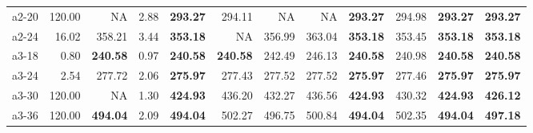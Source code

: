 \documentclass[aspectratio=1610]{beamer}
\begin{document}
\begin{frame}
\begin{table}[]
{\begin{tabular}{lrrrrrrrrrrr}
a2-20                                          & 120.00       & \multicolumn{1}{r|}{NA}                                     & 2.88              & \textbf{293.27} & \multicolumn{1}{r|}{294.11}                                 & NA              & \multicolumn{1}{r|}{NA}       & \textbf{293.27} & \multicolumn{1}{r|}{294.98}                                 & \textbf{293.27} & {\color[HTML]{FE0000} \textbf{293.27}} \\
a2-24                                          & 16.02        & \multicolumn{1}{r|}{358.21}                                 & 3.44              & \textbf{353.18} & \multicolumn{1}{r|}{NA}                                     & 356.99          & \multicolumn{1}{r|}{363.04}   & \textbf{353.18} & \multicolumn{1}{r|}{353.45}                                 & \textbf{353.18} & {\color[HTML]{FE0000} \textbf{353.18}} \\
a3-18                                          & 0.80         & \multicolumn{1}{r|}{\textbf{240.58}}                        & 0.97              & \textbf{240.58} & \multicolumn{1}{r|}{{\color[HTML]{FE0000} \textbf{240.58}}} & 242.49          & \multicolumn{1}{r|}{246.13}   & \textbf{240.58} & \multicolumn{1}{r|}{240.98}                                 & \textbf{240.58} & {\color[HTML]{FE0000} \textbf{240.58}} \\
a3-24                                          & 2.54         & \multicolumn{1}{r|}{277.72}                                 & 2.06              & \textbf{275.97} & \multicolumn{1}{r|}{277.43}                                 & 277.52          & \multicolumn{1}{r|}{277.52}   & \textbf{275.97} & \multicolumn{1}{r|}{277.46}                                 & \textbf{275.97} & {\color[HTML]{FE0000} \textbf{275.97}} \\
a3-30                                          & 120.00       & \multicolumn{1}{r|}{NA}                                     & 1.30              & \textbf{424.93} & \multicolumn{1}{r|}{436.20}                                 & 432.27          & \multicolumn{1}{r|}{436.56}   & \textbf{424.93} & \multicolumn{1}{r|}{430.32}                                 & \textbf{424.93} & {\color[HTML]{FE0000} \textbf{426.12}} \\
a3-36                                          & 120.00       & \multicolumn{1}{r|}{\textbf{494.04}}                        & 2.09              & \textbf{494.04} & \multicolumn{1}{r|}{502.27}                                 & 496.75          & \multicolumn{1}{r|}{500.84}   & \textbf{494.04} & \multicolumn{1}{r|}{502.35}                                 & \textbf{494.04} & {\color[HTML]{FE0000} \textbf{497.18}} \\

\end{tabular}}
\end{table}
\end{frame}
\end{document}
